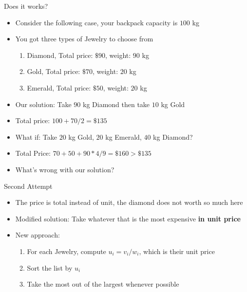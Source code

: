 \documentclass[10pt,xcolor={table,dvipsnames},t]{beamer}
\begin{document}
\begin{frame}{Does it works?}
  \begin{itemize}
    \item Consider the following case, your backpack capacity is $100$ kg
    \item You got three types of Jewelry to choose from
    \begin{enumerate}
      \item Diamond, Total price: $\$90$, weight: $90$ kg
      \item Gold, Total price: $\$70$, weight: $20$ kg
      \item Emerald, Total price: $\$50$, weight: $20$ kg
    \end{enumerate}
    \item Our solution: Take $90$ kg Diamond then take $10$ kg Gold
    \item Total price: $100+70/2=\$135$
    \item What if: Take $20$ kg Gold, $20$ kg Emerald, $40$ kg Diamond?
    \item Total Price: $70+50+90*4/9=\$160>\$135$
    \item What's wrong with our solution?
  \end{itemize}
\end{frame}

\begin{frame}{Second Attempt}
  \begin{itemize}
    \item The price is total instead of unit, the diamond does not worth so much here
    \item Modified solution: Take whatever that is the most expensive \textbf{in unit price}
    \item New approach:
    \begin{enumerate}
      \item For each Jewelry, compute $u_i=v_i/w_i$, which is their unit price
      \item Sort the list by $u_i$
      \item Take the most out of the largest whenever possible
    \end{enumerate}
  \end{itemize}
\end{frame}


\end{document}
